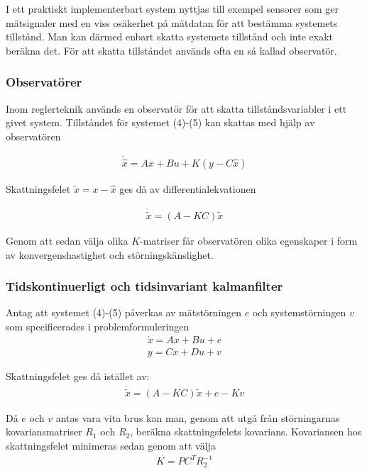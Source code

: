 \documentclass[a4paper,12pt,fleqn]{article}
\begin{document}
I ett praktiskt implementerbart system nyttjas till exempel sensorer som ger mätsignaler med en viss osäkerhet på mätdatan för att bestämma systemets tillstånd. Man kan därmed enbart skatta systemets tillstånd och inte exakt beräkna det. För att skatta tillståndet används ofta en så kallad observatör.

\subsubsection{Observatörer}

Inom reglerteknik används en observatör för att skatta tillståndsvariabler i ett givet system. Tillståndet för systemet (4)-(5) kan skattas med hjälp av observatören

\begin{gather}
\dot{\hat{x}} = Ax + Bu + K(y - C\hat{x})
\label{equ:observer}
\end{gather}

Skattningsfelet $\tilde{x}= x - \hat{x}$ ges då av differentialekvationen

\begin{gather}
\dot{\tilde{x}} = (A - KC)\tilde{x}
\label{equ:observerError}
\end{gather}

Genom att sedan välja olika $K$-matriser får observatören olika egenskaper i form av konvergenshastighet och störningskänslighet. 

\subsubsection{Tidskontinuerligt och tidsinvariant kalmanfilter}

Antag att systemet (4)-(5) påverkas av mätstörningen $e$ och systemstörningen $v$ som specificerades i problemformuleringen
\begin{gather}
\dot{x}=Ax+Bu+e \\
y=Cx+Du+v
\end{gather}

Skattningsfelet ges då istället av: 
\begin{gather}
\dot{\tilde{x}} = (A - KC)\tilde{x} + e - Kv
\end{gather}

Då $e$ och $v$ antas vara vita brus kan man, genom att utgå från störningarnas kovariansmatriser $R_1$ och $R_2$, beräkna skattningsfelets kovarians. Kovariansen hos skattningsfelet minimeras sedan genom att välja 
\begin{gather}
K = PC^{T}R_{2}^{-1}
\end{gather}
\end{document}
